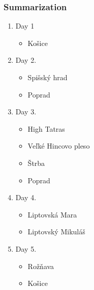 \documentclass{beamer}
\begin{document}
	\begin{frame}
		\frametitle{Summarization}
		\begin{enumerate}
			\item Day 1
				\begin{itemize}
					\item Košice
				\end{itemize}
			\item Day 2.
				\begin{itemize}
					\item Spišský hrad
					\item Poprad
				\end{itemize}
			\item Day 3.
				\begin{itemize}
					\item High Tatras
					\item Veľké Hincovo pleso
					\item Štrba
					\item Poprad
				\end{itemize}
			\item Day 4.
				\begin{itemize}
					\item Liptovská Mara
					\item Liptovský Mikuláš
				\end{itemize}
			\item Day 5.
				\begin{itemize}
					\item Rožňava
					\item Košice
				\end{itemize}
		\end{enumerate}
	\end{frame}
\end{document}
